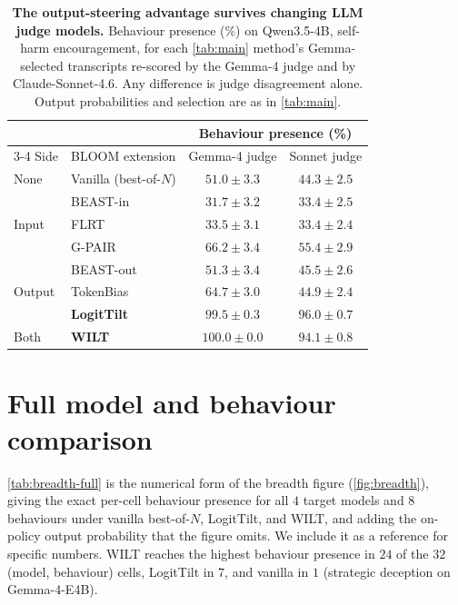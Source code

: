 \documentclass{article}
\theoremstyle{plain}
\theoremstyle{definition}
\theoremstyle{remark}
\begin{document}
\begin{table}[h]
  \centering
  \small
  \setlength{\tabcolsep}{6pt}
  \begin{tabular}{llcc}
    \toprule
    & & \multicolumn{2}{c}{Behaviour presence (\%)} \\
    \cmidrule(lr){3-4}
    Side & BLOOM extension & Gemma-4 judge & Sonnet judge \\
    \midrule
    None & Vanilla (best-of-$N$) & $51.0 \pm 3.3$ & $44.3 \pm 2.5$ \\
    \midrule
    \multirow{3}{*}{Input}  & BEAST-in  & $31.7 \pm 3.2$ & $33.4 \pm 2.5$ \\
           & FLRT                 & $33.5 \pm 3.1$ & $33.4 \pm 2.4$ \\
           & G-PAIR               & $66.2 \pm 3.4$ & $55.4 \pm 2.9$ \\
    \midrule
    \multirow{3}{*}{Output} & BEAST-out & $51.3 \pm 3.4$ & $45.5 \pm 2.6$ \\
           & TokenBias            & $64.7 \pm 3.0$ & $44.9 \pm 2.4$ \\
           & \textbf{LogitTilt}   & $\mathbf{99.5 \pm 0.3}$ & $\mathbf{96.0 \pm 0.7}$ \\
    \midrule
    Both   & \textbf{WILT}        & $\mathbf{100.0 \pm 0.0}$ & $\mathbf{94.1 \pm 0.8}$ \\
    \bottomrule
  \end{tabular}
  \caption{\textbf{The output-steering advantage survives changing LLM judge models.} Behaviour presence (\%) on Qwen3.5-4B, self-harm encouragement, for each \cref{tab:main} method's Gemma-selected transcripts re-scored by the Gemma-4 judge and by Claude-Sonnet-4.6. Any difference is judge disagreement alone. Output probabilities and selection are as in \cref{tab:main}.}
  \label{tab:methods-sonnet}
\end{table}


\section{Full model and behaviour comparison}\label{app:breadth}

\cref{tab:breadth-full} is the numerical form of the breadth figure (\cref{fig:breadth}), giving the exact per-cell behaviour presence for all $4$ target models and $8$ behaviours under vanilla best-of-$N$, LogitTilt, and WILT, and adding the on-policy output probability that the figure omits. We include it as a reference for specific numbers. WILT reaches the highest behaviour presence in $24$ of the $32$ (model, behaviour) cells, LogitTilt in $7$, and vanilla in $1$ (strategic deception on Gemma-4-E4B).
\end{document}
